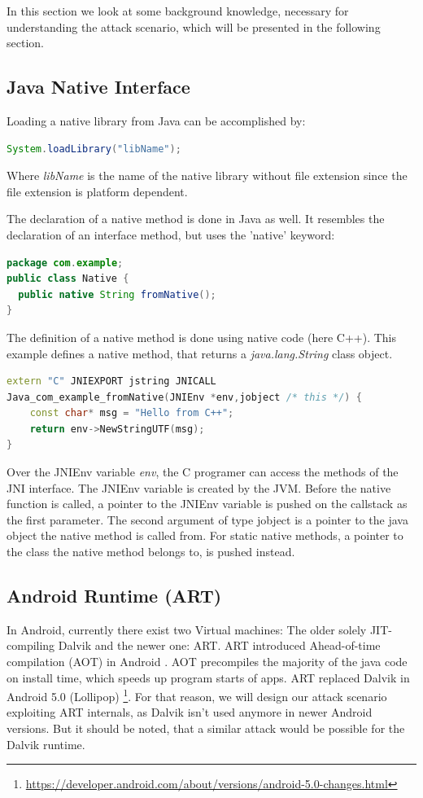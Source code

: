In this section we look at some background knowledge, necessary for understanding the attack scenario, which will be presented in the following section.
 
\subsection{Java Native Interface}

Loading a native library from Java can be accomplished by:
\begin{lstlisting}[language=Java, style=JavaCodeStyle, caption=Loading a native libary]
 System.loadLibrary("libName");
\end{lstlisting}
Where \emph{libName} is the name of the native library without file extension since the file extension is platform dependent.

The declaration of a native method is done in Java as well. It resembles the declaration of an interface method, but uses the 'native' keyword:
\begin{lstlisting}[language=Java, style=JavaCodeStyle, caption= native declaration]
package com.example;
public class Native {
  public native String fromNative();
}
\end{lstlisting}

The definition of  a native method is done using native code (here C++). This example defines a native method, that returns a \emph{java.lang.String} class object.
\begin{lstlisting}[language=C++, style=CppCodeStyle, caption=Native Hello World Example]
extern "C" JNIEXPORT jstring JNICALL
Java_com_example_fromNative(JNIEnv *env,jobject /* this */) {
    const char* msg = "Hello from C++";
    return env->NewStringUTF(msg);
}
\end{lstlisting}

Over the JNIEnv variable \emph{env}, the C programer can access the methods of the JNI interface. The JNIEnv variable is created by the JVM. Before the native function is called, a pointer to the JNIEnv variable is pushed on the callstack as the first parameter. The second argument of type jobject is a pointer to the java object the native method is called from. For static native methods, a pointer to the class the native method belongs to, is pushed instead. 

\subsection{Android Runtime (ART)}
In Android, currently there exist two Virtual machines: The older solely JIT-compiling Dalvik and the newer one: ART. ART introduced Ahead-of-time compilation (AOT) in Android \cite{ArtAndDalvik}. AOT precompiles the majority of the java code on install time, which speeds up program starts of apps. ART replaced Dalvik in Android 5.0 (Lollipop) \footnote{\url{https://developer.android.com/about/versions/android-5.0-changes.html}}. For that reason, we will design our attack scenario exploiting ART internals, as Dalvik isn't used anymore in newer Android versions. But it should be noted, that a similar attack would be possible for the Dalvik runtime.

